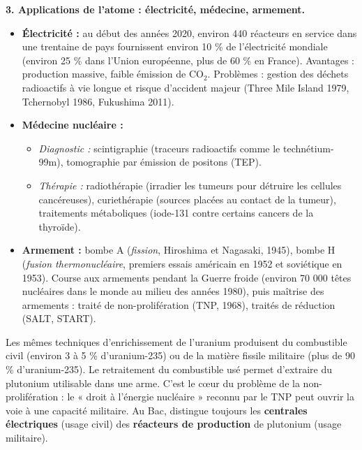 \documentclass[11pt]{article}
\newcommand{\cle}[1]{{\popxbold\color{popdark}#1}}
\begin{document}
\textbf{3. Applications de l'atome : électricité, médecine, armement.}
\begin{itemize}
    \item \textbf{Électricité :} au début des années 2020, environ 440 réacteurs en service dans une trentaine de pays fournissent environ 10 \% de l'électricité mondiale (environ 25 \% dans l'Union européenne, plus de 60 \% en France). Avantages : production massive, faible émission de CO$_2$. Problèmes : gestion des déchets radioactifs à vie longue et risque d'accident majeur (Three Mile Island 1979, Tchernobyl 1986, Fukushima 2011).
    \item \textbf{Médecine nucléaire :}
        \begin{itemize}
            \item \emph{Diagnostic :} scintigraphie (traceurs radioactifs comme le technétium-99m), tomographie par émission de positons (TEP).
            \item \emph{Thérapie :} \cle{radiothérapie} (irradier les tumeurs pour détruire les cellules cancéreuses), curiethérapie (sources placées au contact de la tumeur), traitements métaboliques (iode-131 contre certains cancers de la thyroïde).
        \end{itemize}
    \item \textbf{Armement :} bombe A (\emph{fission}, Hiroshima et Nagasaki, 1945), bombe H (\emph{fusion thermonucléaire}, premiers essais américain en 1952 et soviétique en 1953). Course aux armements pendant la Guerre froide (environ 70 000 têtes nucléaires dans le monde au milieu des années 1980), puis maîtrise des armements : traité de non-prolifération (TNP, 1968), traités de réduction (SALT, START).
\end{itemize}

\begin{attention}
Les mêmes techniques d'enrichissement de l'uranium produisent du combustible civil (environ 3 à 5 \% d'uranium-235) ou de la matière fissile militaire (plus de 90 \% d'uranium-235). Le retraitement du combustible usé permet d'extraire du plutonium utilisable dans une arme. C'est le cœur du problème de la \cle{non-prolifération} : le « droit à l'énergie nucléaire » reconnu par le TNP peut ouvrir la voie à une capacité militaire. Au Bac, distingue toujours les \textbf{centrales électriques} (usage civil) des \textbf{réacteurs de production} de plutonium (usage militaire).
\end{attention}
\end{document}
